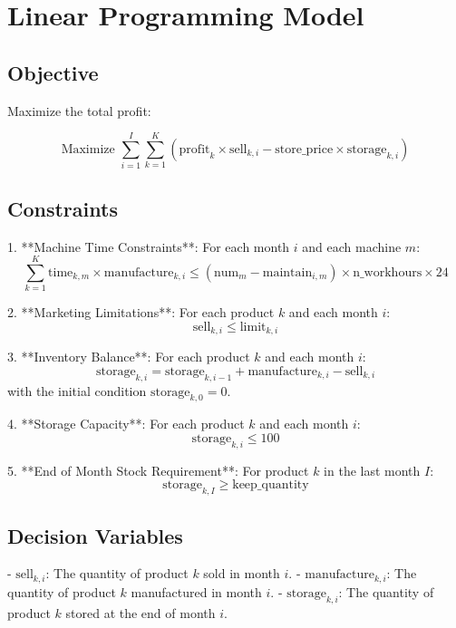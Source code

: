 \documentclass{article}
\begin{document}
\section*{Linear Programming Model}

\subsection*{Objective}

Maximize the total profit:

\[
\text{Maximize } \sum_{i=1}^{I} \sum_{k=1}^{K} \left( \text{profit}_{k} \times \text{sell}_{k,i} - \text{store\_price} \times \text{storage}_{k,i} \right)
\]

\subsection*{Constraints}

1. **Machine Time Constraints**: For each month \(i\) and each machine \(m\):
   \[
   \sum_{k=1}^{K} \text{time}_{k,m} \times \text{manufacture}_{k,i} \leq \left( \text{num}_{m} - \text{maintain}_{i,m} \right) \times \text{n\_workhours} \times 24
   \]

2. **Marketing Limitations**: For each product \(k\) and each month \(i\):
   \[
   \text{sell}_{k,i} \leq \text{limit}_{k,i}
   \]

3. **Inventory Balance**: For each product \(k\) and each month \(i\):
   \[
   \text{storage}_{k,i} = \text{storage}_{k,i-1} + \text{manufacture}_{k,i} - \text{sell}_{k,i}
   \]
   with the initial condition \(\text{storage}_{k,0} = 0\).

4. **Storage Capacity**: For each product \(k\) and each month \(i\):
   \[
   \text{storage}_{k,i} \leq 100
   \]

5. **End of Month Stock Requirement**: For product \(k\) in the last month \(I\):
   \[
   \text{storage}_{k,I} \geq \text{keep\_quantity}
   \]

\subsection*{Decision Variables}

- \(\text{sell}_{k,i}\): The quantity of product \(k\) sold in month \(i\).
- \(\text{manufacture}_{k,i}\): The quantity of product \(k\) manufactured in month \(i\).
- \(\text{storage}_{k,i}\): The quantity of product \(k\) stored at the end of month \(i\).
\end{document}
